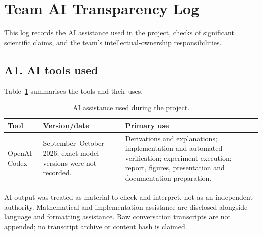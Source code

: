 \section{Team AI Transparency Log}\label{app:ai}
This log records the AI assistance used in the project, checks of significant scientific claims, and the team's intellectual-ownership responsibilities.

\subsection*{A1. AI tools used}
Table~\ref{tab:ai-tools} summarises the tools and their uses.
\begin{table}[H]\centering\small
\caption{AI assistance used during the project.}\label{tab:ai-tools}
\begin{tabular}{p{3cm}p{4cm}p{7cm}}\toprule
Tool & Version/date & Primary use\\\midrule
OpenAI Codex & September--October 2026; exact model versions were not recorded. & Derivations and explanations; implementation and automated verification; experiment execution; report, figures, presentation and documentation preparation.\\\bottomrule
\end{tabular}
\end{table}
AI output was treated as material to check and interpret, not as an independent authority. Mathematical and implementation assistance are disclosed alongside language and formatting assistance. Raw conversation transcripts are not appended; no transcript archive or content hash is claimed.

